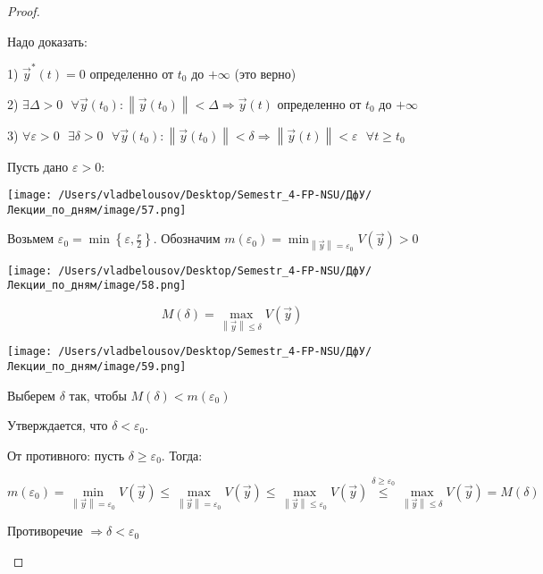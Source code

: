 \documentclass[12pt, a4paper]{report}
\begin{document}
\begin{proof} \(  \) 

    Надо доказать: 

    1) \( \vec{y }  ^* (t ) = 0 \) определенно от \( t_0     \)  до \( +\infty   \) (это верно)

    2) \( \exists  \Delta >0 \text{ }  \forall  \vec{y } (t_0 ) :  \left\lVert \vec{y }  (t_0) \right\rVert < \Delta \Rightarrow \vec{y } (t) \) определенно от \( t_0  \) до \( +\infty  \) 

    3) \( \forall  \varepsilon > 0 \text{ }  \exists  \delta > 0 \text{ }  \forall  \vec{ y }  (t_0 ) : \left\lVert \vec{y }  (t_0 ) \right\rVert < \delta \Rightarrow \left\lVert \vec{y } (t) \right\rVert < \varepsilon \text{ }  \forall  t \ge  t_0 \) 

    Пусть дано \( \varepsilon  > 0\): 

    \begin{center}
        \texttt{[image: /Users/vladbelousov/Desktop/Semestr\_4-FP-NSU/ДфУ/Лекции\_по\_дням/image/57.png]}
    \end{center}

    Возьмем \(\displaystyle  \varepsilon_0 = \min  \left\{   \varepsilon , \frac{r}{2 } \right\} \). Обозначим \(\displaystyle  m(\varepsilon_0) = \min_{\left\lVert \vec{y }  \right\rVert = \varepsilon_0 } V(\vec{y }  )>0  \) 

    \begin{center}
        \texttt{[image: /Users/vladbelousov/Desktop/Semestr\_4-FP-NSU/ДфУ/Лекции\_по\_дням/image/58.png]}
    \end{center}

    \[ M (\delta ) = \max _{\left\lVert \vec{y  }  \right\rVert \le  \delta } V(\vec{y }  )  \] 

    \begin{center}
        \texttt{[image: /Users/vladbelousov/Desktop/Semestr\_4-FP-NSU/ДфУ/Лекции\_по\_дням/image/59.png]}
    \end{center}

    Выберем \( \delta  \) так, чтобы \( M(\delta ) < m (\varepsilon_0 ) \) 



    Утверждается, что \( \delta  < \varepsilon_0 \).

    От противного: пусть \( \delta \ge  \varepsilon_0  \). Тогда: 

    \[ m(\varepsilon_0 ) = \min _{\left\lVert \vec{y }  \right\rVert = \varepsilon_0} V(\vec{y } ) \le  \max _{ \left\lVert \vec{y }  \right\rVert = \varepsilon_0 }  V(\vec{y } ) \le  \max _{\left\lVert \vec{y }  \right\rVert \le  \varepsilon_0  } V(\vec{y} ) \overset{\delta \ge  \varepsilon_0}{\le } \max _{\left\lVert \vec{y }    \right\rVert \le  \delta } V(\vec{y }  ) = M(\delta )    \] 
    \begin{center}
        Противоречие \( \Rightarrow \delta < \varepsilon_0 \) \\
    \end{center} 


\end{proof}
\end{document}
